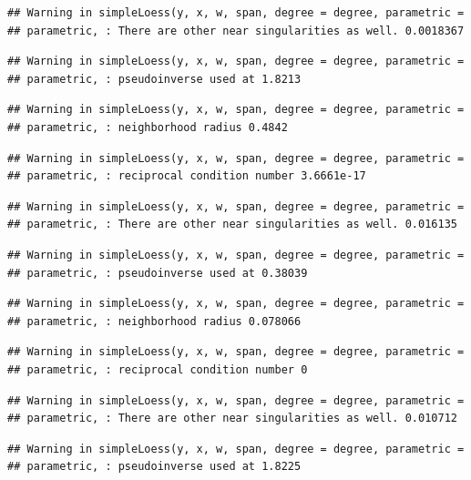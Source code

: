 \documentclass[]{article}
\begin{document}
\begin{verbatim}
## Warning in simpleLoess(y, x, w, span, degree = degree, parametric =
## parametric, : There are other near singularities as well. 0.0018367
\end{verbatim}

\begin{verbatim}
## Warning in simpleLoess(y, x, w, span, degree = degree, parametric =
## parametric, : pseudoinverse used at 1.8213
\end{verbatim}

\begin{verbatim}
## Warning in simpleLoess(y, x, w, span, degree = degree, parametric =
## parametric, : neighborhood radius 0.4842
\end{verbatim}

\begin{verbatim}
## Warning in simpleLoess(y, x, w, span, degree = degree, parametric =
## parametric, : reciprocal condition number 3.6661e-17
\end{verbatim}

\begin{verbatim}
## Warning in simpleLoess(y, x, w, span, degree = degree, parametric =
## parametric, : There are other near singularities as well. 0.016135
\end{verbatim}

\begin{verbatim}
## Warning in simpleLoess(y, x, w, span, degree = degree, parametric =
## parametric, : pseudoinverse used at 0.38039
\end{verbatim}

\begin{verbatim}
## Warning in simpleLoess(y, x, w, span, degree = degree, parametric =
## parametric, : neighborhood radius 0.078066
\end{verbatim}

\begin{verbatim}
## Warning in simpleLoess(y, x, w, span, degree = degree, parametric =
## parametric, : reciprocal condition number 0
\end{verbatim}

\begin{verbatim}
## Warning in simpleLoess(y, x, w, span, degree = degree, parametric =
## parametric, : There are other near singularities as well. 0.010712
\end{verbatim}

\begin{verbatim}
## Warning in simpleLoess(y, x, w, span, degree = degree, parametric =
## parametric, : pseudoinverse used at 1.8225
\end{verbatim}
\end{document}
